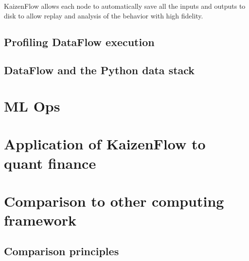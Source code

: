 \documentclass[11pt, reqno]{amsart}
\theoremstyle{definition}
\theoremstyle{remark}
\begin{document}
  KaizenFlow allows each node to automatically save all the inputs and outputs to
  disk to allow replay and analysis of the behavior with high fidelity.

  \subsection{Profiling DataFlow execution}


  \subsection{DataFlow and the Python data stack}

  \section{ML Ops}

  \section{Application of KaizenFlow to quant finance}


  \section{Comparison to other computing framework}

  \subsection{Comparison principles}
\end{document}
